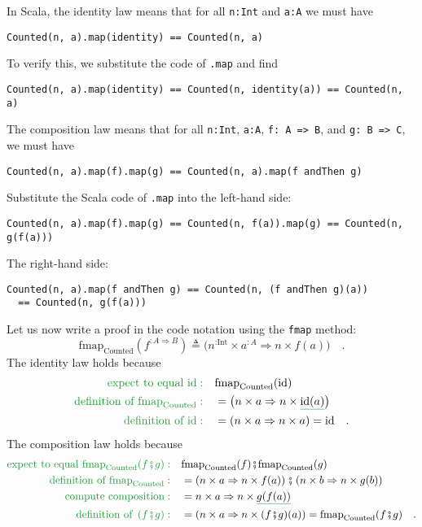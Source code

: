 In Scala, the identity law means that for all \lstinline!n:Int! and
\lstinline!a:A! we must have
\begin{lstlisting}
Counted(n, a).map(identity) == Counted(n, a)
\end{lstlisting}
To verify this, we substitute the code of \lstinline!.map! and find
\begin{lstlisting}
Counted(n, a).map(identity) == Counted(n, identity(a)) == Counted(n, a)
\end{lstlisting}

The composition law means that for all \lstinline!n:Int!, \lstinline!a:A!,
\lstinline!f: A => B!, and \lstinline!g: B => C!, we must have
\begin{lstlisting}
Counted(n, a).map(f).map(g) == Counted(n, a).map(f andThen g)
\end{lstlisting}
Substitute the Scala code of \lstinline!.map! into the left-hand
side:
\begin{lstlisting}
Counted(n, a).map(f).map(g) == Counted(n, f(a)).map(g) == Counted(n, g(f(a)))
\end{lstlisting}
The right-hand side:
\begin{lstlisting}
Counted(n, a).map(f andThen g) == Counted(n, (f andThen g)(a))
  == Counted(n, g(f(a)))
\end{lstlisting}

Let us now write a proof in the code notation using the \lstinline!fmap!
method:
\[
\text{fmap}_{\text{Counted}}(f^{:A\Rightarrow B})\triangleq\big(n^{:\text{Int}}\times a^{:A}\Rightarrow n\times f(a)\big)\quad.
\]
The identity law holds because
\begin{align*}
{\color{greenunder}\text{expect to equal }\text{id}:}\quad & \text{fmap}_{\text{Counted}}(\text{id})\\
{\color{greenunder}\text{definition of }\text{fmap}_{\text{Counted}}:}\quad & =\big(n\times a\Rightarrow n\times\gunderline{\text{id}(a)}\big)\\
{\color{greenunder}\text{definition of }\text{id}:}\quad & =\left(n\times a\Rightarrow n\times a\right)=\text{id}\quad.
\end{align*}
The composition law holds because
\begin{align*}
{\color{greenunder}\text{expect to equal }\text{fmap}_{\text{Counted}}(f\bef g):}\quad & \text{fmap}_{\text{Counted}}(f)\bef\text{fmap}_{\text{Counted}}(g)\\
{\color{greenunder}\text{definition of }\text{fmap}_{\text{Counted}}:}\quad & =\left(n\times a\Rightarrow n\times f(a)\right)\bef\left(n\times b\Rightarrow n\times g(b)\right)\\
{\color{greenunder}\text{compute composition}:}\quad & =n\times a\Rightarrow n\times\gunderline{g(f(a))}\\
{\color{greenunder}\text{definition of }\left(f\bef g\right):}\quad & =\left(n\times a\Rightarrow n\times(f\bef g)(a)\right)=\text{fmap}_{\text{Counted}}(f\bef g)\quad.
\end{align*}

